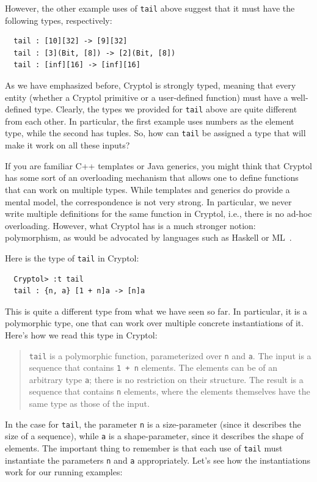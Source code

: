 However, the other example uses of {\tt tail} above suggest that it
must have the following types, respectively:
\begin{Verbatim}
  tail : [10][32] -> [9][32]
  tail : [3](Bit, [8]) -> [2](Bit, [8])
  tail : [inf][16] -> [inf][16]
\end{Verbatim}

As we have emphasized before, Cryptol is strongly typed, meaning that
every entity (whether a Cryptol primitive or a user-defined function)
must have a well-defined type. Clearly, the types we provided for
\texttt{tail} above are quite different from each other. In particular, the
first example uses numbers as the element type, while the second has
tuples. So, how can \texttt{tail} be assigned a type that will make it
work on all these inputs?

If you are familiar C++ templates or Java generics, you might think
that Cryptol has some sort of an overloading mechanism that allows one
to define functions that can work on multiple types. While templates
and generics do provide a mental model, the correspondence is not very
strong. In particular, we never write multiple definitions for the
same function in Cryptol, i.e., there is no ad-hoc
overloading. However, what Cryptol has is a much stronger notion:
polymorphism, as would be advocated by languages such as Haskell or
ML~\cite{ML,Has98}.\indPolymorphism\indOverloading

Here is the type of {\tt tail} in Cryptol:
\begin{Verbatim}
  Cryptol> :t tail
  tail : {n, a} [1 + n]a -> [n]a
\end{Verbatim}
This is quite a different type from what we have seen so far. In
particular, it is a polymorphic type, one that can work over multiple
concrete instantiations of it. Here's how we read this type in
Cryptol:
\begin{quote} \texttt{tail} is a polymorphic function, parameterized over
  \texttt{n} and \texttt{a}. The input is a sequence that contains
  \texttt{1 + n} elements. The elements can be of an arbitrary type
  \texttt{a}; there is no restriction on their structure. The result
  is a sequence that contains \texttt{n} elements, where the elements
  themselves have the same type as those of the input.
\end{quote}
In the case for \texttt{tail}, the parameter \texttt{n} is a size-parameter
(since it describes the size of a sequence), while \texttt{a} is a
shape-parameter, since it describes the shape of elements. The
important thing to remember is that each use of \texttt{tail} must
instantiate the parameters \texttt{n} and \texttt{a} appropriately. Let's
see how the instantiations work for our running examples:

